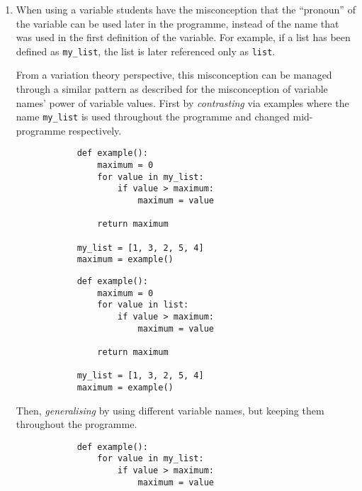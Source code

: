 \begin{enumerate}
    \item When using a variable students have the misconception that the 
      \enquote{pronoun} of the variable can be used later in the programme, 
      instead of the name that was used in the first definition of the 
      variable. For example, if a list has been defined as 
      \texttt{my_list}, the list is later referenced only as 
      \texttt{list}.

      From a variation theory perspective, this misconception can be 
managed through a similar pattern as described for the misconception 
of variable names' power of variable values. First by \emph{
contrasting} via examples where the name \texttt{my_list} 
is used throughout the programme and changed mid-programme 
respectively. 
      
    \hfill
     \begin{minipage}[t]{0.45\columnwidth}
        \begin{verbatim}
            def example():
                maximum = 0
                for value in my_list:
                    if value > maximum:
                        maximum = value
    
                return maximum
                
            my_list = [1, 3, 2, 5, 4]
            maximum = example()
        \end{verbatim}
    \end{minipage}
\hfill
    \begin{minipage}[t]{0.45\columnwidth}
        \begin{verbatim}
            def example():
                maximum = 0
                for value in list:
                    if value > maximum:
                        maximum = value
    
                return maximum

            my_list = [1, 3, 2, 5, 4]
            maximum = example()
        \end{verbatim}
    \end{minipage}
\hfill
     
      Then, \emph{generalising} by using different variable names, but 
keeping them throughout the programme. 

        \hfill

        \begin{verbatim}
            def example():
                for value in my_list:
                    if value > maximum:
                        maximum = value
    


\end{verbatim}
\end{enumerate}
